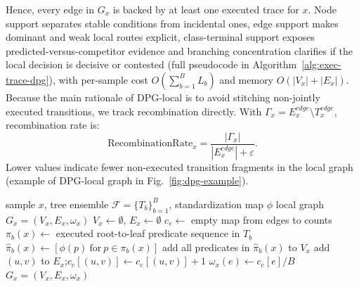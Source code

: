 \documentclass[runningheads]{llncs}
\begin{document}
Hence, every edge in $G_x$ is backed by at least one executed trace for $x$. Node support separates stable conditions from incidental ones, edge support makes dominant and weak local routes explicit, class-terminal support exposes predicted-versus-competitor evidence and branching concentration clarifies if the local decision is decisive or contested (full pseudocode in Algorithm~\ref{alg:exec-trace-dpg}), with per-sample cost $O(\sum_{b=1}^{B}L_b)$ and memory $O(|V_x|+|E_x|)$.
Because the main rationale of DPG-local is to avoid stitching non-jointly executed transitions, we track recombination directly. 
With $\Gamma_x=E_x^{edge}\setminus T_x^{edge}$, recombination rate is:
$$ \mathrm{RecombinationRate}_x=\frac{|\Gamma_x|}{|E_x^{edge}|+\varepsilon}.$$
Lower values indicate fewer non-executed transition fragments in the local graph (example of DPG-local graph in Fig.~\ref{fig:dpg-example}).

\begin{algorithm}[ht]
\caption{DPG-local construction}
\label{alg:exec-trace-dpg}
\begin{algorithmic}[1]
\Require sample $x$, tree ensemble $\mathcal{F}=\{T_b\}_{b=1}^B$, standardization map $\phi$
\Ensure local graph $G_x=(V_x,E_x,\omega_x)$
\State $V_x \gets \emptyset$, $E_x \gets \emptyset$
\State $c_e \gets$ empty map from edges to counts
  \State $\pi_b(x) \gets$ executed root-to-leaf predicate sequence in $T_b$
  \State $\hat{\pi}_b(x) \gets [\phi(p)\ \text{for}\ p\in\pi_b(x)]$
  \State add all predicates in $\hat{\pi}_b(x)$ to $V_x$
    \State add $(u,v)$ to $E_x$;\quad $c_e[(u,v)] \gets c_e[(u,v)] + 1$
  \EndFor
\EndFor
{}
  \State $\omega_x(e) \gets c_e[e]/B$
\EndFor
\State \Return $G_x=(V_x,E_x,\omega_x)$
\end{algorithmic}
\end{algorithm}
\end{document}
